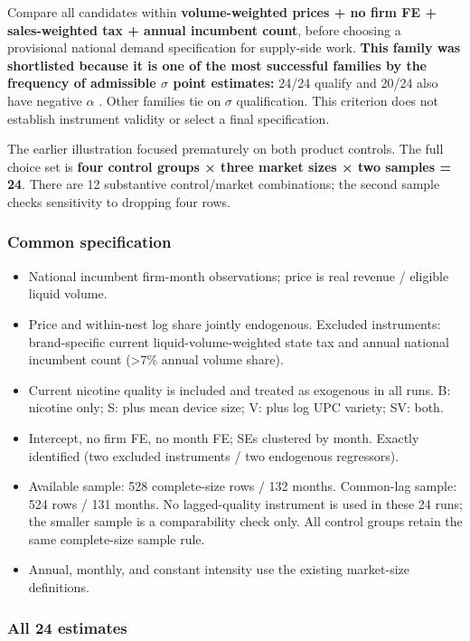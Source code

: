 \documentclass[10pt,]{article}
\providecommand{\tightlist}{%
  \setlength{\itemsep}{0pt}\setlength{\parskip}{0pt}}
\begin{document}
Compare all candidates within \textbf{volume-weighted prices + no firm
FE + sales-weighted tax + annual incumbent count}, before choosing a
provisional national demand specification for supply-side work.
\textbf{This family was shortlisted because it is one of the most
successful families by the frequency of admissible \(\sigma\) point
estimates:} 24/24 qualify and 20/24 also have negative \(\alpha\) .
Other families tie on \(\sigma\) qualification. This criterion does not
establish instrument validity or select a final specification.

The earlier illustration focused prematurely on both product controls.
The full choice set is \textbf{four control groups × three market sizes
× two samples = 24}. There are 12 substantive control/market
combinations; the second sample checks sensitivity to dropping four
rows.

\subsubsection{Common specification}\label{common-specification}

\begin{itemize}
\tightlist
\item
  National incumbent firm-month observations; price is real revenue /
  eligible liquid volume.
\item
  Price and within-nest log share jointly endogenous. Excluded
  instruments: brand-specific current liquid-volume-weighted state tax
  and annual national incumbent count (\textgreater{}7\% annual volume
  share).
\item
  Current nicotine quality is included and treated as exogenous in all
  runs. B: nicotine only; S: plus mean device size; V: plus log UPC
  variety; SV: both.
\item
  Intercept, no firm FE, no month FE; SEs clustered by month. Exactly
  identified (two excluded instruments / two endogenous regressors).
\item
  Available sample: 528 complete-size rows / 132 months. Common-lag
  sample: 524 rows / 131 months. No lagged-quality instrument is used in
  these 24 runs; the smaller sample is a comparability check only. All
  control groups retain the same complete-size sample rule.
\item
  Annual, monthly, and constant intensity use the existing market-size
  definitions.
\end{itemize}

\subsubsection{All 24 estimates}\label{all-24-estimates}
\end{document}
